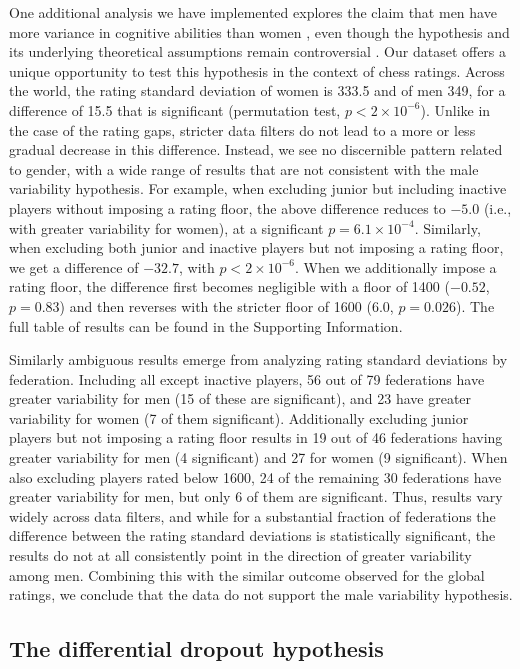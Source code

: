 \documentclass[9pt,twocolumn,twoside,lineno]{pnas-new}
\newcommand{\SI}{Supporting Information}
\begin{document}
One additional analysis we have implemented explores the claim that men have more variance in cognitive abilities than women \cite{shields1982variability}, even though the hypothesis and its underlying theoretical assumptions remain controversial \cite{hyde2009performance}. Our dataset offers a unique opportunity to test this hypothesis in the context of chess ratings. Across the world, the rating standard deviation of women is 333.5 and of men 349, for a difference of 15.5 that is significant (permutation test, $p < 2\times 10^{-6}$). Unlike in the case of the rating gaps, stricter data filters do not lead to a more or less gradual decrease in this difference. Instead, we see no discernible pattern related to gender, with a wide range of results that are not consistent with the male variability hypothesis. For example, when excluding junior but including inactive players without imposing a rating floor, the above difference reduces to $-5.0$ (i.e., with greater variability for women), at a significant $p = 6.1\times 10^{-4}$. Similarly, when excluding both junior and inactive players but not imposing a rating floor, we get a difference of $-32.7$, with $p < 2 \times 10^{-6}$. When we additionally impose a rating floor, the difference first becomes negligible with a floor of 1400 ($-0.52$, $p = 0.83$) and then reverses with the stricter floor of 1600 ($6.0$, $p = 0.026$). The full table of results can be found in the \SI.

Similarly ambiguous results emerge from analyzing rating standard deviations by federation. Including all except inactive players, 56 out of 79 federations have greater variability for men (15 of these are significant), and 23 have greater variability for women (7 of them significant). Additionally excluding junior players but not imposing a rating floor results in 19 out of 46 federations having greater variability for men (4 significant) and 27 for women (9 significant). When also excluding players rated below 1600, 24 of the remaining 30 federations have greater variability for men, but only 6 of them are significant. Thus, results vary widely across data filters, and while for a substantial fraction of federations the difference between the rating standard deviations is statistically significant, the results do not at all consistently point in the direction of greater variability among men. Combining this with the similar outcome observed for the global ratings, we conclude that the data do not support the male variability hypothesis.


\subsection*{The differential dropout hypothesis}
\end{document}
